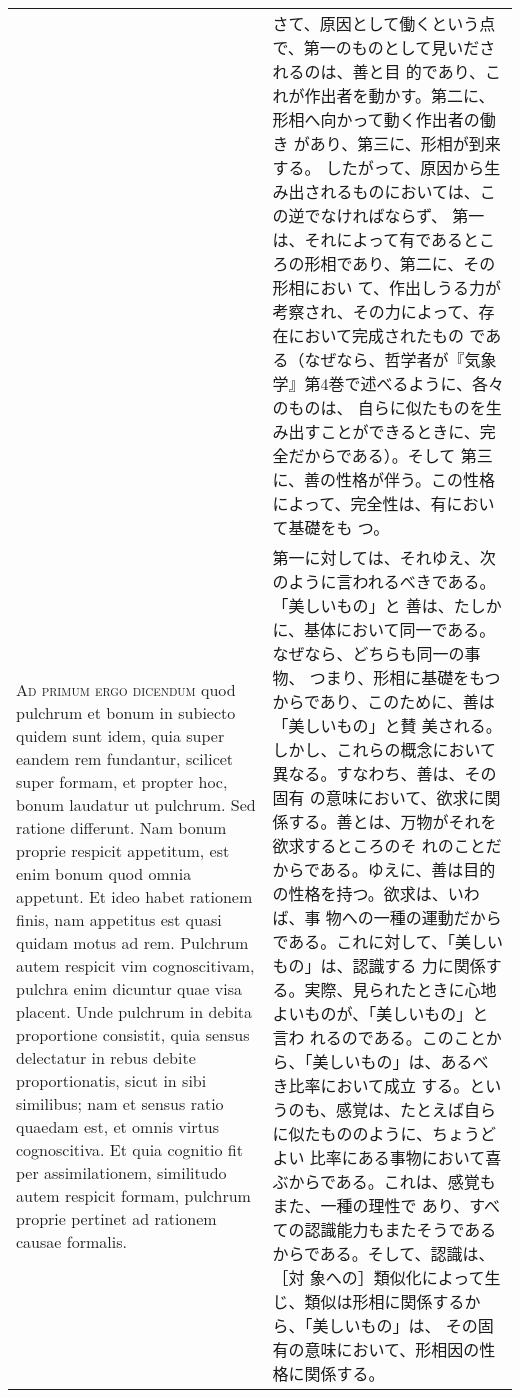 \documentclass[10pt]{jsarticle}
\begin{document}
\begin{longtable}{p{21em}p{21em}}
&


さて、原因として働くという点で、第一のものとして見いだされるのは、善と目
 的であり、これが作出者を動かす。第二に、形相へ向かって動く作出者の働き
 があり、第三に、形相が到来する。
したがって、原因から生み出されるものにおいては、この逆でなければならず、
 第一は、それによって有であるところの形相であり、第二に、その形相におい
 て、作出しうる力が考察され、その力によって、存在において完成されたもの
 である（なぜなら、哲学者が『気象学』第4巻で述べるように、各々のものは、
 自らに似たものを生み出すことができるときに、完全だからである）。そして
 第三に、善の性格が伴う。この性格によって、完全性は、有において基礎をも
 つ。

\\



{\scshape Ad primum ergo dicendum} quod pulchrum et bonum in subiecto quidem
 sunt idem, quia super eandem rem fundantur, scilicet super formam, et
 propter hoc, bonum laudatur ut pulchrum. Sed ratione differunt. Nam
 bonum proprie respicit appetitum, est enim bonum quod omnia
 appetunt. Et ideo habet rationem finis, nam appetitus est quasi quidam
 motus ad rem. Pulchrum autem respicit vim cognoscitivam, pulchra enim
 dicuntur quae visa placent. Unde pulchrum in debita proportione
 consistit, quia sensus delectatur in rebus debite proportionatis, sicut
 in sibi similibus; nam et sensus ratio quaedam est, et omnis virtus
 cognoscitiva. Et quia cognitio fit per assimilationem, similitudo autem
 respicit formam, pulchrum proprie pertinet ad rationem causae formalis.

&


第一に対しては、それゆえ、次のように言われるべきである。「美しいもの」と
 善は、たしかに、基体において同一である。なぜなら、どちらも同一の事物、
 つまり、形相に基礎をもつからであり、このために、善は「美しいもの」と賛
 美される。しかし、これらの概念において異なる。すなわち、善は、その固有
 の意味において、欲求に関係する。善とは、万物がそれを欲求するところのそ
 れのことだからである。ゆえに、善は目的の性格を持つ。欲求は、いわば、事
 物への一種の運動だからである。これに対して、「美しいもの」は、認識する
 力に関係する。実際、見られたときに心地よいものが、「美しいもの」と言わ
 れるのである。このことから、「美しいもの」は、あるべき比率において成立
 する。というのも、感覚は、たとえば自らに似たもののように、ちょうどよい
 比率にある事物において喜ぶからである。これは、感覚もまた、一種の理性で
 あり、すべての認識能力もまたそうであるからである。そして、認識は、［対
 象への］類似化によって生じ、類似は形相に関係するから、「美しいもの」は、
 その固有の意味において、形相因の性格に関係する。


\end{longtable}
\end{document}
